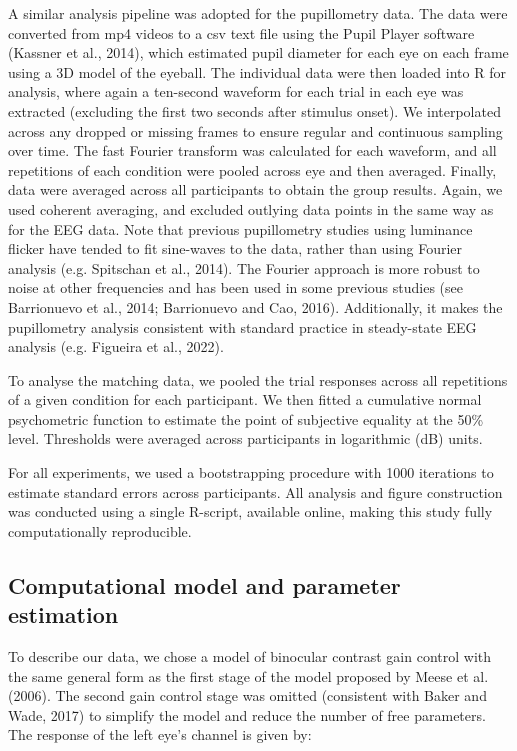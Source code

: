 \documentclass[
]{article}
\begin{document}
A similar analysis pipeline was adopted for the pupillometry data. The data were converted from mp4 videos to a csv text file using the Pupil Player software (Kassner et al., 2014), which estimated pupil diameter for each eye on each frame using a 3D model of the eyeball. The individual data were then loaded into R for analysis, where again a ten-second waveform for each trial in each eye was extracted (excluding the first two seconds after stimulus onset). We interpolated across any dropped or missing frames to ensure regular and continuous sampling over time. The fast Fourier transform was calculated for each waveform, and all repetitions of each condition were pooled across eye and then averaged. Finally, data were averaged across all participants to obtain the group results. Again, we used coherent averaging, and excluded outlying data points in the same way as for the EEG data. Note that previous pupillometry studies using luminance flicker have tended to fit sine-waves to the data, rather than using Fourier analysis (e.g. Spitschan et al., 2014). The Fourier approach is more robust to noise at other frequencies and has been used in some previous studies (see Barrionuevo et al., 2014; Barrionuevo and Cao, 2016). Additionally, it makes the pupillometry analysis consistent with standard practice in steady-state EEG analysis (e.g. Figueira et al., 2022).

To analyse the matching data, we pooled the trial responses across all repetitions of a given condition for each participant. We then fitted a cumulative normal psychometric function to estimate the point of subjective equality at the 50\% level. Thresholds were averaged across participants in logarithmic (dB) units.

For all experiments, we used a bootstrapping procedure with 1000 iterations to estimate standard errors across participants. All analysis and figure construction was conducted using a single R-script, available online, making this study fully computationally reproducible.

\hypertarget{computational-model-and-parameter-estimation}{%
\subsection{Computational model and parameter estimation}\label{computational-model-and-parameter-estimation}}

To describe our data, we chose a model of binocular contrast gain control with the same general form as the first stage of the model proposed by Meese et al. (2006). The second gain control stage was omitted (consistent with Baker and Wade, 2017) to simplify the model and reduce the number of free parameters. The response of the left eye's channel is given by:
\end{document}
